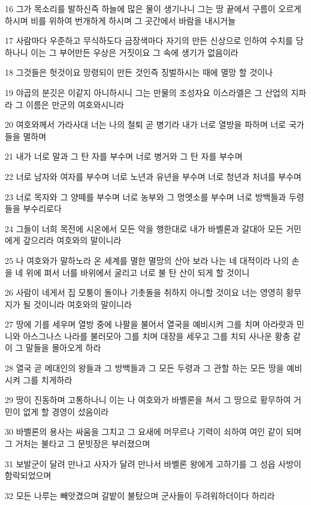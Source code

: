 \par 16 그가 목소리를 발하신즉 하늘에 많은 물이 생기나니 그는 땅 끝에서 구름이 오르게 하시며 비를 위하여 번개하게 하시며 그 곳간에서 바람을 내시거늘
\par 17 사람마다 우준하고 무식하도다 금장색마다 자기의 만든 신상으로 인하여 수치를 당하나니 이는 그 부어만든 우상은 거짓이요 그 속에 생기가 없음이라
\par 18 그것들은 헛것이요 망령되이 만든 것인즉 징벌하시는 때에 멸망 할 것이나
\par 19 야곱의 분깃은 이같지 아니하시니 그는 만물의 조성자요 이스라엘은 그 산업의 지파라 그 이름은 만군의 여호와시니라
\par 20 여호와께서 가라사대 너는 나의 철퇴 곧 병기라 내가 너로 열방을 파하며 너로 국가들을 멸하며
\par 21 내가 너로 말과 그 탄 자를 부수며 너로 병거와 그 탄 자를 부수며
\par 22 너로 남자와 여자를 부수며 너로 노년과 유년을 부수며 너로 청년과 처녀를 부수며
\par 23 너로 목자와 그 양떼를 부수며 너로 농부와 그 멍엣소를 부수며 너로 방백들과 두령들을 부수리로다
\par 24 그들이 너희 목전에 시온에서 모든 악을 행한대로 내가 바벨론과 갈대아 모든 거민에게 갚으리라 여호와의 말이니라
\par 25 나 여호와가 말하노라 온 세계를 멸한 멸망의 산아 보라 나는 네 대적이라 나의 손을 네 위에 펴서 너를 바위에서 굴리고 너로 불 탄 산이 되게 할 것이니
\par 26 사람이 네게서 집 모퉁이 돌이나 기촛돌을 취하지 아니할 것이요 너는 영영히 황무지가 될 것이니라 여호와의 말이니라
\par 27 땅에 기를 세우며 열방 중에 나팔을 불어서 열국을 예비시켜 그를 치며 아라랏과 민니와 아스그나스 나라를 불러모아 그를 치며 대장을 세우고 그를 치되 사나운 황충 같이 그 말들을 몰아오게 하라
\par 28 열국 곧 메대인의 왕들과 그 방백들과 그 모든 두령과 그 관할 하는 모든 땅을 예비시켜 그를 치게하라
\par 29 땅이 진동하며 고통하나니 이는 나 여호와가 바벨론을 쳐서 그 땅으로 황무하여 거민이 없게 할 경영이 섰음이라
\par 30 바벨론의 용사는 싸움을 그치고 그 요새에 머무르나 기력이 쇠하여 여인 같이 되며 그 거처는 불타고 그 문빗장은 부러졌으며
\par 31 보발군이 달려 만나고 사자가 달려 만나서 바벨론 왕에게 고하기를 그 성읍 사방이 함락되었으며
\par 32 모든 나루는 빼앗겼으며 갈밭이 불탔으며 군사들이 두려워하더이다 하리라
